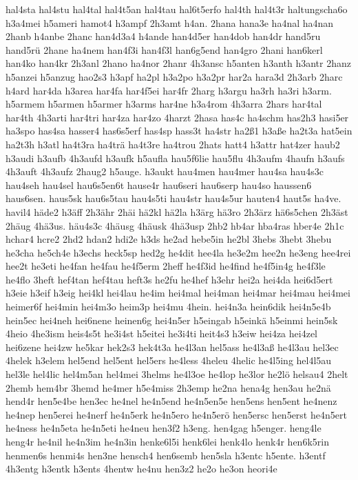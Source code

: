 {hal4sta
hal4stu
hal4tal
hal4t5an
hal4tau
hal6t5erfo
hal4th
hal4t3r
haltungscha6o
h3a4mei
h5ameri
hamot4
h3ampf
2h3amt
h4an.
2hana
hana3e
ha4nal
ha4nan
2hanb
h4anbe
2hanc
han4d3a4
h4ande
han4d5er
han4dob
han4dr
hand5ru
hand5rü
2hane
ha4nem
han4f3i
han4f3l
han6g5end
han4gro
2hani
han6kerl
han4ko
han4kr
2h3anl
2hano
ha4nor
2hanr
4h3ansc
h5anten
h3anth
h3antr
2hanz
h5anzei
h5anzug
hao2s3
h3apf
ha2pl
h3a2po
h3a2pr
har2a
hara3d
2h3arb
2harc
h4ard
har4da
h3area
har4fa
har4f5ei
har4fr
2harg
h3argu
ha3rh
ha3ri
h3arm.
h5armem
h5armen
h5armer
h3arms
har4ne
h3a4rom
4h3arra
2hars
har4tal
har4th
4h3arti
har4tri
har4za
har4zo
4harzt
2hasa
has4c
ha4schm
has2h3
hasi5er
ha3spo
has4sa
hasser4
has6s5erf
has4sp
hass3t
ha4str
ha2ß1
h3aße
ha2t3a
hat5ein
ha2t3h
h3atl
ha4t3ra
ha4trä
ha4t3re
ha4trou
2hats
hatt4
h3attr
hat4zer
haub2
h3audi
h3aufb
4h3aufd
h3aufk
h5aufla
hau5f6lie
hau5flu
4h3aufm
4haufn
h3aufs
4h3auft
4h3aufz
2haug2
h5auge.
h3aukt
hau4men
hau4mer
hau4sa
hau4s3c
hau4seh
hau4sel
hau6s5en6t
hause4r
hau6seri
hau6serp
hau4so
haussen6
haus6sen.
haus5sk
hau6s5tau
hau4s5ti
hau4str
hau4s5ur
hauten4
haut5s
ha4ve.
havil4
häde2
h3äff
2h3ähr
2häi
hä2kl
hä2la
h3ärg
hä3ro
2h3ärz
hä6s5chen
2h3äst
2häug
4hä3us.
häu4s3c
4häusg
4häusk
4hä3usp
2hb2
hb4ar
hba4ras
hber4e
2h1c
hchar4
hcre2
2hd2
hdan2
hdi2e
h3ds
he2ad
hebe5in
he2bl
3hebs
3hebt
3hebu
he3cha
he5ch4e
h3echs
heck5sp
hed2g
he4dit
hee4la
he3e2m
hee2n
he3eng
hee4rei
hee2t
he3eti
he4fan
he4fau
he4f5erm
2heff
he4f3id
he4find
he4f5in4g
he4f3le
he4flo
3heft
hef4tan
hef4tau
heft3s
he2fu
he4hef
h3ehr
hei2a
hei4da
hei6d5ert
h3eie
h3eif
h3eig
hei4kl
hei4lau
he4im
hei4mal
hei4man
hei4mar
hei4mau
hei4mei
heimer6f
hei4min
hei4m3o
heim3p
hei4mu
4hein.
hei4n3a
hein6dik
hei4n5e4b
hein5ec
hei4neh
hei6nene
heinen6g
hei4n5er
h5eingab
h5einkä
h5einmi
hein5sk
4heio
4he3ism
heis4s5t
he3i4st
h5eitei
he3i4ti
heit4s3
h3eiw
hei4za
hei4zel
hei6zene
hei4zw
he5kar
hek2s3
hek4t3a
he4l3an
hel5ass
he4l3aß
he4l3au
hel3ec
4helek
h3elem
hel5end
hel5ent
hel5ers
he4less
4heleu
4helic
he4l5ing
hel4l5au
hel3le
hel4lic
hel4m5an
hel4mei
3helms
he4l3oe
he4lop
he3lor
he2lö
helsau4
2helt
2hemb
hem4br
3hemd
he4mer
h5e4miss
2h3emp
he2na
hena4g
hen3au
he2nä
hend4r
hen5e4be
hen3ec
he4nel
he4n5end
he4n5en5e
hen5ens
hen5ent
he4nenz
he4nep
hen5erei
he4nerf
he4n5erk
he4n5ero
he4n5erö
hen5ersc
hen5erst
he4n5ert
he4ness
he4n5eta
he4n5eti
he4neu
hen3f2
h3eng.
hen4gag
h5enger.
heng4le
heng4r
he4nil
he4n3im
he4n3in
henke6l5i
henk6lei
henk4lo
henk4r
hen6k5rin
henmen6s
henmi4s
hen3ne
hensch4
hen6semb
hen5sla
h3entc
h5ente.
h3entf
4h3entg
h3entk
h3ents
4hentw
he4nu
hen3z2
he2o
he3on
heori4e
}
